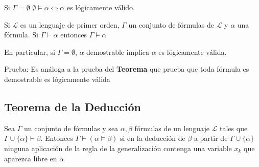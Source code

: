 \begin{example}

Si $\Gamma = \emptyset$ $\emptyset \models \alpha \iff \alpha$ es l\'ogicamente v\'alido.

\end{example}

\begin{proposition}

Si $\mathcal{L}$ es un lenguaje de primer orden, $\Gamma$ un conjunto de f\'ormulas de $\mathcal{L}$ y $\alpha$ una f\'ormula. Si $\Gamma \vdash \alpha$ entonces $\Gamma \models \alpha$
 
En particular, si $\Gamma = \emptyset$, $\alpha$ demostrable implica $\alpha$ es l\'ogicamente v\'alida.

Prueba: Es an\'aloga a la prueba del \textbf{Teorema} que prueba que toda f\'ormula es demostrable es l\'ogicamente v\'alida

\end{proposition}

\subsection{Teorema de la Deducci\'on}

Sea $\Gamma$ un conjunto de f\'ormulas y sea $\alpha, \beta$ f\'ormulas de un lenguaje $\mathcal{L}$ tales que $\Gamma \cup \{\alpha \} \vdash \beta$. Entonces $\Gamma \vdash (\alpha \models \beta)$ si en la deducci\'on de $\beta$ a partir de $\Gamma \cup \{ \alpha \}$ ninguna aplicaci\'on de la regla de la generalizaci\'on contenga una variable $x_k$ que aparezca libre en $\alpha$

